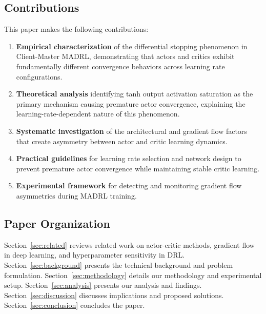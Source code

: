 \subsection{Contributions}

This paper makes the following contributions:

\begin{enumerate}
    \item \textbf{Empirical characterization} of the differential stopping phenomenon in Client-Master MADRL, demonstrating that actors and critics exhibit fundamentally different convergence behaviors across learning rate configurations.

    \item \textbf{Theoretical analysis} identifying tanh output activation saturation as the primary mechanism causing premature actor convergence, explaining the learning-rate-dependent nature of this phenomenon.

    \item \textbf{Systematic investigation} of the architectural and gradient flow factors that create asymmetry between actor and critic learning dynamics.

    \item \textbf{Practical guidelines} for learning rate selection and network design to prevent premature actor convergence while maintaining stable critic learning.

    \item \textbf{Experimental framework} for detecting and monitoring gradient flow asymmetries during MADRL training.
\end{enumerate}

\subsection{Paper Organization}

Section~\ref{sec:related} reviews related work on actor-critic methods, gradient flow in deep learning, and hyperparameter sensitivity in DRL. Section~\ref{sec:background} presents the technical background and problem formulation. Section~\ref{sec:methodology} details our methodology and experimental setup. Section~\ref{sec:analysis} presents our analysis and findings. Section~\ref{sec:discussion} discusses implications and proposed solutions. Section~\ref{sec:conclusion} concludes the paper.

